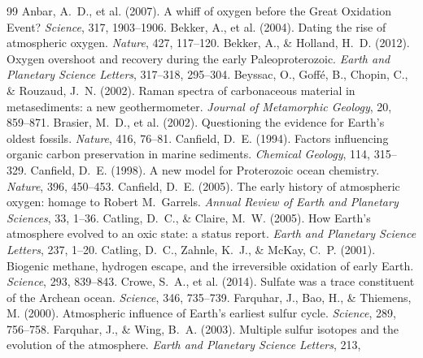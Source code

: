 \documentclass[11pt]{article}
\begin{document}

\begin{thebibliography}{99}\footnotesize\linespread{0.92}\selectfont\setlength{\itemsep}{0pt}\setlength{\parskip}{0pt}
 Anbar, A.~D., et al. (2007). A whiff of oxygen before the
Great Oxidation Event? \textit{Science}, 317, 1903--1906.
 Bekker, A., et al. (2004). Dating the rise of atmospheric
oxygen. \textit{Nature}, 427, 117--120.
 Bekker, A., \& Holland, H.~D. (2012). Oxygen overshoot
and recovery during the early Paleoproterozoic. \textit{Earth and Planetary Science Letters},
317--318, 295--304.
 Beyssac, O., Goff\'{e}, B., Chopin, C., \& Rouzaud,
J.~N. (2002). Raman spectra of carbonaceous material in metasediments: a new geothermometer.
\textit{Journal of Metamorphic Geology}, 20, 859--871.
 Brasier, M.~D., et al. (2002). Questioning the evidence
for Earth's oldest fossils. \textit{Nature}, 416, 76--81.
 Canfield, D.~E. (1994). Factors influencing organic carbon
preservation in marine sediments. \textit{Chemical Geology}, 114, 315--329.
 Canfield, D.~E. (1998). A new model for Proterozoic ocean
chemistry. \textit{Nature}, 396, 450--453.
 Canfield, D.~E. (2005). The early history of atmospheric
oxygen: homage to Robert M.~Garrels. \textit{Annual Review of Earth and Planetary Sciences}, 33,
1--36.
 Catling, D.~C., \& Claire, M.~W. (2005). How Earth's
atmosphere evolved to an oxic state: a status report. \textit{Earth and Planetary Science Letters},
237, 1--20.
 Catling, D.~C., Zahnle, K.~J., \& McKay, C.~P. (2001).
Biogenic methane, hydrogen escape, and the irreversible oxidation of early Earth. \textit{Science},
293, 839--843.
 Crowe, S.~A., et al. (2014). Sulfate was a trace constituent
of the Archean ocean. \textit{Science}, 346, 735--739.
 Farquhar, J., Bao, H., \& Thiemens, M. (2000).
Atmospheric influence of Earth's earliest sulfur cycle. \textit{Science}, 289, 756--758.
 Farquhar, J., \& Wing, B.~A. (2003). Multiple sulfur
isotopes and the evolution of the atmosphere. \textit{Earth and Planetary Science Letters}, 213,

\end{thebibliography}
\end{document}
